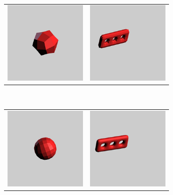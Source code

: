 \documentclass[12pt,a4paper]{scrartcl}
\begin{document}
\begin{center}
\begin{tabular}{cc}
	\end{tabular}
	\ \\
	\begin{tabular}{cc}
		\includegraphics[width=150px, height=150px]{Images/cube-1sd.png} 
		& \includegraphics[width=150px, height=150px]{Images/threeholes-1sd.png}  \\
	\end{tabular}
	\ \\
	\begin{tabular}{cc}
		\includegraphics[width=150px, height=150px]{Images/cube-2sd.png} 
		& \includegraphics[width=150px, height=150px]{Images/threeholes-2sd.png}  \\
	\end{tabular}
	\ \\

\end{center}
\end{document}
